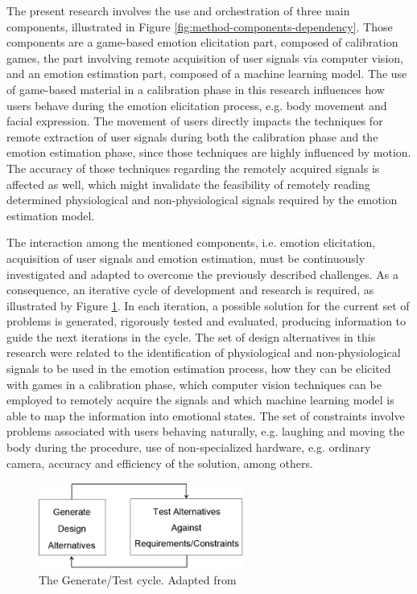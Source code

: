 The present research involves the use and orchestration of three main components, illustrated in Figure \ref{fig:method-components-dependency}. Those components are a game-based emotion elicitation part, composed of calibration games, the part involving remote acquisition of user signals via computer vision, and an emotion estimation part, composed of a machine learning model. The use of game-based material in a calibration phase in this research influences how users behave during the emotion elicitation process, e.g. body movement and facial expression. The movement of users directly impacts the techniques for remote extraction of user signals during both the calibration phase and the emotion estimation phase, since those techniques are highly influenced by motion. The accuracy of those techniques regarding the remotely acquired signals is affected as well, which might invalidate the feasibility of remotely reading determined physiological and non-physiological signals required by the emotion estimation model.

The interaction among the mentioned components, i.e. emotion elicitation, acquisition of user signals and emotion estimation, must be continuously investigated and adapted to overcome the previously described challenges. As a consequence, an iterative cycle of development and research is required, as illustrated by Figure \ref{fig:hevner-generate-test}. In each iteration, a possible solution for the current set of problems is generated, rigorously tested and evaluated, producing information to guide the next iterations in the cycle. The set of design alternatives in this research were related to the identification of physiological and non-physiological signals to be used in the emotion estimation process, how they can be elicited with games in a calibration phase, which computer vision techniques can be employed to remotely acquire the signals and which machine learning model is able to map the information into emotional states. The set of constraints involve problems associated with users behaving naturally, e.g. laughing and moving the body during the procedure, use of non-specialized hardware, e.g. ordinary camera, accuracy and efficiency of the solution, among others.

\begin{figure}[h]
    \centering
    \includegraphics[width=0.6\textwidth]{Content/figures/hevner-generate-test.png}
    \caption{The Generate/Test cycle. Adapted from \textcite{hevner2004design}}
    \label{fig:hevner-generate-test}
\end{figure}

